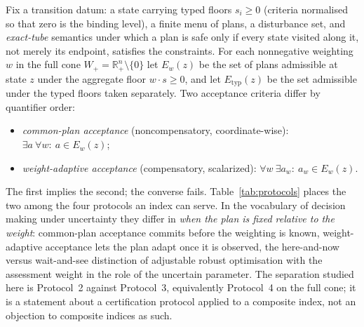 \documentclass[preprint,11pt,authoryear]{elsarticle}
\theoremstyle{definition}
\theoremstyle{remark}
\newcommand{\Etyp}{E_{\mathrm{typ}}}
\newcommand{\Wp}{W_+}
\newcommand{\Rp}{\mathbb{R}^n_+}
\begin{document}
Fix a transition datum: a state carrying typed floors $s_i\ge0$ (criteria normalised so that zero is the binding level), a finite menu of plans, a disturbance set, and \emph{exact-tube} semantics under which a plan is safe only if every state visited along it, not merely its endpoint, satisfies the constraints. For each nonnegative weighting $w$ in the full cone $\Wp=\Rp\setminus\{0\}$ let $E_w(z)$ be the set of plans admissible at state $z$ under the aggregate floor $w\cdot s\ge0$, and let $\Etyp(z)$ be the set admissible under the typed floors taken separately. Two acceptance criteria differ by quantifier order:
\begin{itemize}[leftmargin=2em]
\item \emph{common-plan acceptance} (noncompensatory, coordinate-wise): $\exists a\ \forall w:\ a\in E_w(z)$;
\item \emph{weight-adaptive acceptance} (compensatory, scalarized): $\forall w\ \exists a_w:\ a_w\in E_w(z)$.
\end{itemize}
The first implies the second; the converse fails. Table~\ref{tab:protocols} places the two among the four protocols an index can serve. In the vocabulary of decision making under uncertainty they differ in \emph{when the plan is fixed relative to the weight}: common-plan acceptance commits before the weighting is known, weight-adaptive acceptance lets the plan adapt once it is observed, the here-and-now versus wait-and-see distinction of adjustable robust optimisation \citep{BenTal2004} with the assessment weight in the role of the uncertain parameter. The separation studied here is Protocol~2 against Protocol~3, equivalently Protocol~4 on the full cone; it is a statement about a certification protocol applied to a composite index, not an objection to composite indices as such.
\end{document}
